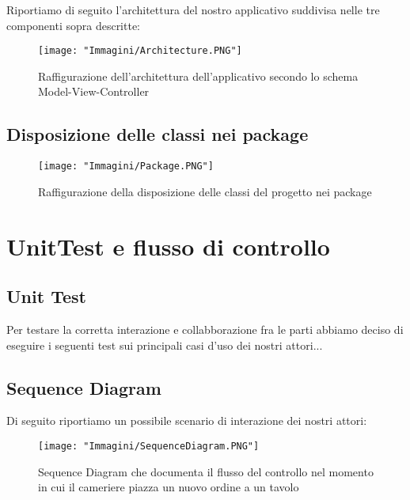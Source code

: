 \documentclass{article}
\begin{document}
\newpage

Riportiamo di seguito l'architettura del nostro applicativo suddivisa nelle tre componenti sopra descritte:

\begin{figure}[!h]
\centering
\texttt{[image: "Immagini/Architecture.PNG"]}
\caption{Raffigurazione dell'architettura dell'applicativo secondo lo schema Model-View-Controller}
\end{figure}

\newpage

\subsection{Disposizione delle classi nei package} 

\begin{figure}[!h]
\centering
\texttt{[image: "Immagini/Package.PNG"]}
\caption{Raffigurazione della disposizione delle classi del progetto nei package}
\end{figure}

\section{UnitTest e flusso di controllo}
\subsection{Unit Test}
Per testare la corretta interazione e collabborazione fra le parti abbiamo deciso di eseguire i seguenti test sui principali casi d'uso dei nostri attori...


\newpage

\subsection{Sequence Diagram}
Di seguito riportiamo un possibile scenario di interazione dei nostri attori:

\begin{figure}[!h]
\centering
\texttt{[image: "Immagini/SequenceDiagram.PNG"]}
\caption{Sequence Diagram che documenta il flusso del controllo nel momento in cui il cameriere piazza un nuovo ordine a un tavolo}
\label{SequenceDiagram}
\end{figure}
\end{document}
